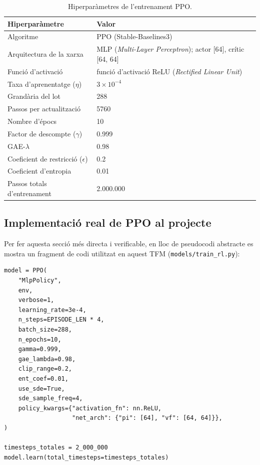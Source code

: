 \documentclass[a4paper,12pt,twoside]{ThesisStyle}
\begin{document}
\begin{table}[htb]
\centering
\begin{tabular}{@{}lp{8cm}@{}}
\toprule
\textbf{Hiperparàmetre} & \textbf{Valor} \\
\midrule
Algoritme & PPO (Stable-Baselines3) \\
Arquitectura de la xarxa & MLP (\textit{Multi-Layer Perceptron}); actor [64], crític [64, 64] \\
Funció d'activació & funció d'activació ReLU (\textit{Rectified Linear Unit}) \\
Taxa d'aprenentatge ($\eta$) & $3 \times 10^{-4}$ \\
Grandària del lot & 288 \\
Passos per actualització & 5760 \\
Nombre d'épocs & 10 \\
Factor de descompte ($\gamma$) & 0.999 \\
GAE-$\lambda$ & 0.98 \\
Coeficient de restricció ($\epsilon$) & 0.2 \\
Coeficient d'entropia & 0.01 \\
Passos totals d'entrenament & 2.000.000 \\
\bottomrule
\end{tabular}
\caption{Hiperparàmetres de l'entrenament PPO.}
\label{taula:hiperparams}
\end{table}
\FloatBarrier

\subsection{Implementació real de PPO al projecte}

Per fer aquesta secció més directa i verificable, en lloc de pseudocodi abstracte es mostra un fragment de codi utilitzat en aquest TFM (\texttt{models/train\_rl.py}):

\begin{samepage}
{\small
\begin{verbatim}
model = PPO(
    "MlpPolicy",
    env,
    verbose=1,
    learning_rate=3e-4,
    n_steps=EPISODE_LEN * 4,
    batch_size=288,
    n_epochs=10,
    gamma=0.999,
    gae_lambda=0.98,
    clip_range=0.2,
    ent_coef=0.01,
    use_sde=True,
    sde_sample_freq=4,
    policy_kwargs={"activation_fn": nn.ReLU,
                   "net_arch": {"pi": [64], "vf": [64, 64]}},
)

timesteps_totales = 2_000_000
model.learn(total_timesteps=timesteps_totales)
\end{verbatim}
}
\end{samepage}
\end{document}
